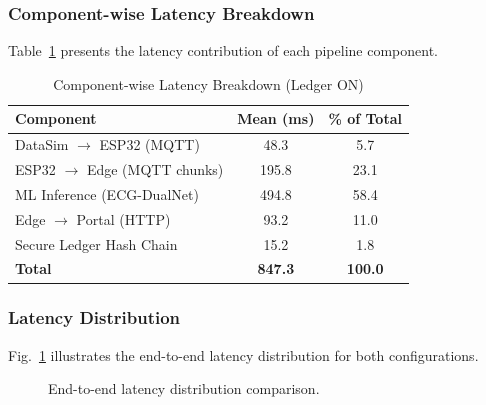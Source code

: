 \documentclass[10pt,twocolumn]{article}
\begin{document}
\subsubsection{Component-wise Latency Breakdown}

Table~\ref{tab:breakdown} presents the latency contribution of each pipeline component.

\begin{table}[htbp]
\centering
\caption{Component-wise Latency Breakdown (Ledger ON)}
\label{tab:breakdown}
\footnotesize
\begin{tabular}{@{}lcc@{}}
\toprule
\textbf{Component} & \textbf{Mean (ms)} & \textbf{\% of Total} \\
\midrule
DataSim $\rightarrow$ ESP32 (MQTT) & 48.3 & 5.7 \\
ESP32 $\rightarrow$ Edge (MQTT chunks) & 195.8 & 23.1 \\
ML Inference (ECG-DualNet) & 494.8 & 58.4 \\
Edge $\rightarrow$ Portal (HTTP) & 93.2 & 11.0 \\
Secure Ledger Hash Chain & 15.2 & 1.8 \\
\midrule
\textbf{Total} & \textbf{847.3} & \textbf{100.0} \\
\bottomrule
\end{tabular}
\end{table}

\subsubsection{Latency Distribution}

Fig.~\ref{fig:latency_dist} illustrates the end-to-end latency distribution for both configurations.

\begin{figure}[htbp]
\centering
{}
\caption{End-to-end latency distribution comparison.}
\label{fig:latency_dist}
\end{figure}
\end{document}
